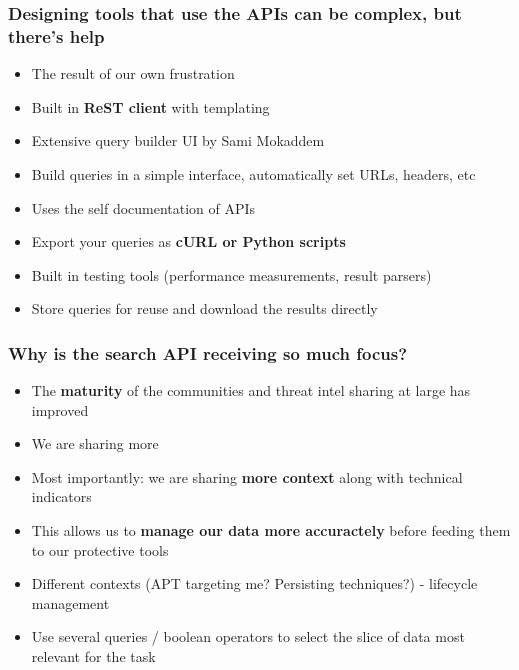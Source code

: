 \begin{frame}
\frametitle{Designing tools that use the APIs can be complex, but there's help}
    \begin{itemize}
	\item The result of our own frustration
	\item Built in {\bf ReST client} with templating
        \item Extensive query builder UI by Sami Mokaddem
	\item Build queries in a simple interface, automatically set URLs, headers, etc
	\item Uses the self documentation of APIs
	\item Export your queries as {\bf cURL or Python scripts}
	\item Built in testing tools (performance measurements, result parsers)
        \item Store queries for reuse and download the results directly
    \end{itemize}
\end{frame}

\begin{frame}
\frametitle{Why is the search API receiving so much focus?}
    \begin{itemize}
	\item The {\bf maturity} of the communities and threat intel sharing at large has improved
	\item We are sharing more
	\item Most importantly: we are sharing {\bf more context} along with technical indicators
	\item This allows us to {\bf manage our data more accuractely} before feeding them to our protective tools
	\item Different contexts (APT targeting me? Persisting techniques?) - lifecycle management
	\item Use several queries / boolean operators to select the slice of data most relevant for the task
    \end{itemize}
\end{frame}

